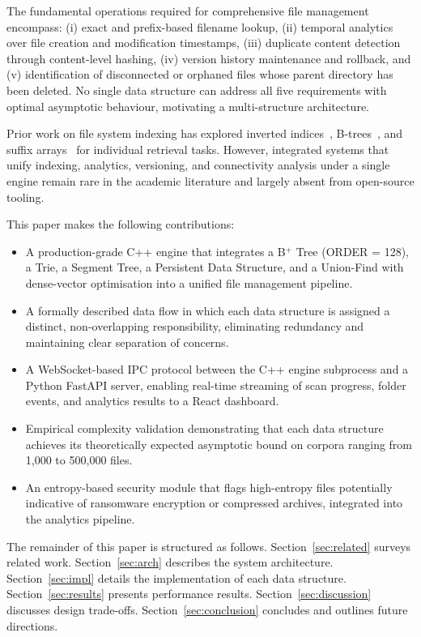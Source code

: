 \documentclass[conference]{IEEEtran}
\begin{document}
The fundamental operations required for comprehensive file management encompass: (i) exact and prefix-based filename lookup, (ii) temporal analytics over file creation and modification timestamps, (iii) duplicate content detection through content-level hashing, (iv) version history maintenance and rollback, and (v) identification of disconnected or orphaned files whose parent directory has been deleted. No single data structure can address all five requirements with optimal asymptotic behaviour, motivating a multi-structure architecture.

Prior work on file system indexing has explored inverted indices~\cite{zobel2006inverted}, B-trees~\cite{comer1979ubiquitous}, and suffix arrays~\cite{manber1993suffix} for individual retrieval tasks. However, integrated systems that unify indexing, analytics, versioning, and connectivity analysis under a single engine remain rare in the academic literature and largely absent from open-source tooling.

This paper makes the following contributions:

\begin{itemize}
    \item A production-grade C++ engine that integrates a B$^+$ Tree (ORDER = 128), a Trie, a Segment Tree, a Persistent Data Structure, and a Union-Find with dense-vector optimisation into a unified file management pipeline.
    \item A formally described data flow in which each data structure is assigned a distinct, non-overlapping responsibility, eliminating redundancy and maintaining clear separation of concerns.
    \item A WebSocket-based IPC protocol between the C++ engine subprocess and a Python FastAPI server, enabling real-time streaming of scan progress, folder events, and analytics results to a React dashboard.
    \item Empirical complexity validation demonstrating that each data structure achieves its theoretically expected asymptotic bound on corpora ranging from 1{,}000 to 500{,}000 files.
    \item An entropy-based security module that flags high-entropy files potentially indicative of ransomware encryption or compressed archives, integrated into the analytics pipeline.
\end{itemize}

The remainder of this paper is structured as follows. Section~\ref{sec:related} surveys related work. Section~\ref{sec:arch} describes the system architecture. Section~\ref{sec:impl} details the implementation of each data structure. Section~\ref{sec:results} presents performance results. Section~\ref{sec:discussion} discusses design trade-offs. Section~\ref{sec:conclusion} concludes and outlines future directions.
\end{document}
